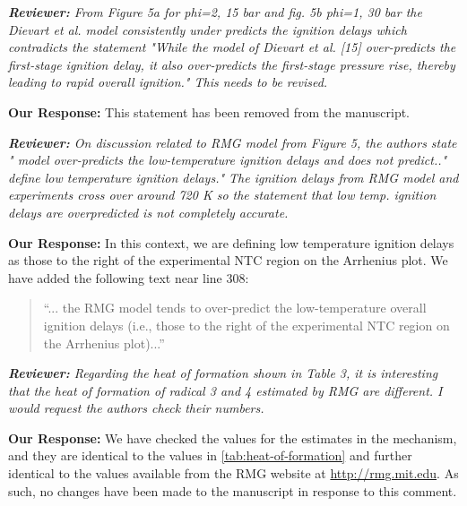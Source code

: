 \documentclass{article}
\newenvironment{reviewer}{\vspace{0.5\baselineskip}\begingroup\itshape\textbf{Reviewer:}}{\endgroup\vspace{0.5\baselineskip}}
\newenvironment{response}{\vspace{0.5\baselineskip}\textbf{Our Response:}}{\vspace{0.5\baselineskip}}
\begin{document}
\begin{reviewer}
    From Figure 5a for phi=2, 15 bar and  fig. 5b phi=1, 30 bar the  Dievart et al. model
    consistently under predicts the ignition delays which contradicts the statement "While the
    model of Dievart et al. [15] over-predicts the first-stage ignition delay, it also over-predicts
    the first-stage pressure rise, thereby leading  to rapid overall ignition." This needs to be
    revised.
\end{reviewer}

\begin{response}
    This statement has been removed from the manuscript.
\end{response}

\begin{reviewer}
    On discussion related to RMG model from Figure 5, the authors state " model over-predicts the
    low-temperature ignition delays and does not predict.." define low temperature ignition delays."
    The ignition delays from RMG model and experiments cross over around 720 K so the statement that
    low temp. ignition delays are overpredicted is not completely accurate.
\end{reviewer}

\begin{response}
    In this context, we are defining low temperature ignition delays as those to the right of the
    experimental NTC region on the Arrhenius plot. We have added the following text near line 308:

    \begin{quote}
        ``... the RMG model tends to over-predict the low-temperature overall ignition delays (i.e.,
        those to the right of the experimental NTC region on the Arrhenius plot)...''
    \end{quote}
\end{response}

\begin{reviewer}
    Regarding the heat of formation shown in Table 3, it is interesting that the heat of formation
    of radical 3 and 4 estimated by RMG are different. I would request the authors check their
    numbers.
\end{reviewer}

\begin{response}
    We have checked the values for the estimates in the mechanism, and they are identical to the
    values in \cref{tab:heat-of-formation} and further identical to the values available from the
    RMG website at \url{http://rmg.mit.edu}. As such, no changes have been made to the manuscript in
    response to this comment.
\end{response}
\end{document}
